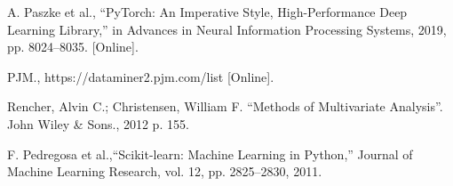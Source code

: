 \documentclass[journal]{IEEEtran}
\begin{document}
\begin{thebibliography}{2}
A. Paszke et al., “PyTorch: An Imperative Style, High-Performance Deep Learning Library,” in Advances in Neural Information Processing Systems, 2019, pp. 8024–8035. [Online].

PJM., https://dataminer2.pjm.com/list [Online].

Rencher, Alvin C.; Christensen, William F. ``Methods of Multivariate Analysis''. John Wiley \& Sons., 2012 p. 155.

F. Pedregosa et al.,``Scikit-learn: Machine Learning in Python,” Journal of Machine Learning Research, vol. 12, pp. 2825–2830, 2011.



\end{thebibliography}
\end{document}
